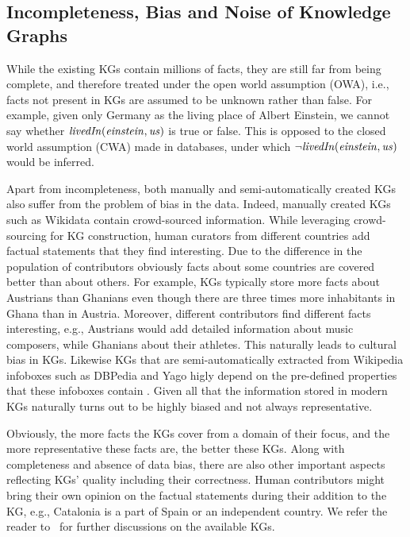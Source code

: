 \subsection{Incompleteness, Bias and Noise of Knowledge Graphs}
\label{sec:kg_realm}
While the existing KGs contain millions of facts, they are still far from being complete, and therefore treated under the open world assumption (OWA), i.e., facts not present in KGs are assumed to be unknown rather than false. For example, given only Germany as the living place of Albert Einstein,  we cannot say whether $\mathit{livedIn(einstein,us)}$ is true or false. This is opposed to the closed world assumption (CWA) made in databases, under which $\mathit{\neg livedIn(einstein,us)}$ would be inferred. %

Apart from incompleteness, both manually and semi-automatically created KGs also suffer from the problem of bias in the data. Indeed,  manually created KGs such as Wikidata contain crowd-sourced information. While leveraging crowd-sourcing for KG construction, human curators from different countries add factual statements that they find interesting. Due to the difference in the population of contributors obviously facts about some countries are covered better than about others. For example, KGs typically store more facts about Austrians than Ghanians even though there are three times more inhabitants in Ghana than in Austria.
Moreover, different contributors find different facts interesting, e.g., Austrians would add detailed information about music composers, while Ghanians about their athletes.  This naturally leads to cultural bias in KGs. Likewise KGs that are semi-automatically extracted from Wikipedia infoboxes such as DBPedia and Yago higly depend on the pre-defined properties that these infoboxes contain \cite{DBLP:conf/www/LajusS18}. Given all that the information stored in modern KGs naturally turns out to be highly biased and not always representative. 

Obviously, the more facts the KGs cover from a %
domain  of their focus, and the more representative these facts are, %
the better these KGs. Along with completeness and absence of data bias, there are also other important aspects reflecting KGs' quality %
including %
their correctness. Human contributors might bring their own opinion on the factual statements during their addition
to the KG, e.g., Catalonia is a part of Spain or an independent country.  We refer the reader to~\cite{Nickel2015ARO,DBLP:journals/semweb/Paulheim17} for further discussions on the available KGs.



